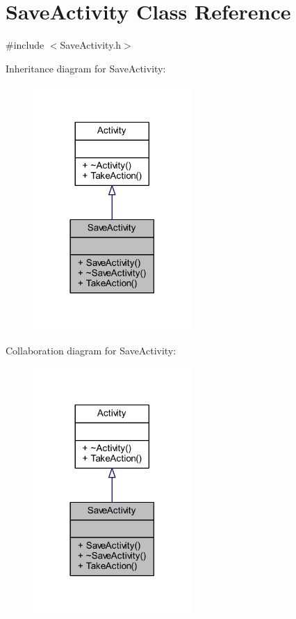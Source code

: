 \hypertarget{class_save_activity}{}\section{Save\+Activity Class Reference}
\label{class_save_activity}


{\ttfamily \#include $<$Save\+Activity.\+h$>$}



Inheritance diagram for Save\+Activity\+:\nopagebreak
\begin{figure}[H]
\begin{center}
\leavevmode
\includegraphics[width=170pt]{class_save_activity__inherit__graph}
\end{center}
\end{figure}


Collaboration diagram for Save\+Activity\+:\nopagebreak
\begin{figure}[H]
\begin{center}
\leavevmode
\includegraphics[width=170pt]{class_save_activity__coll__graph}
\end{center}
\end{figure}
